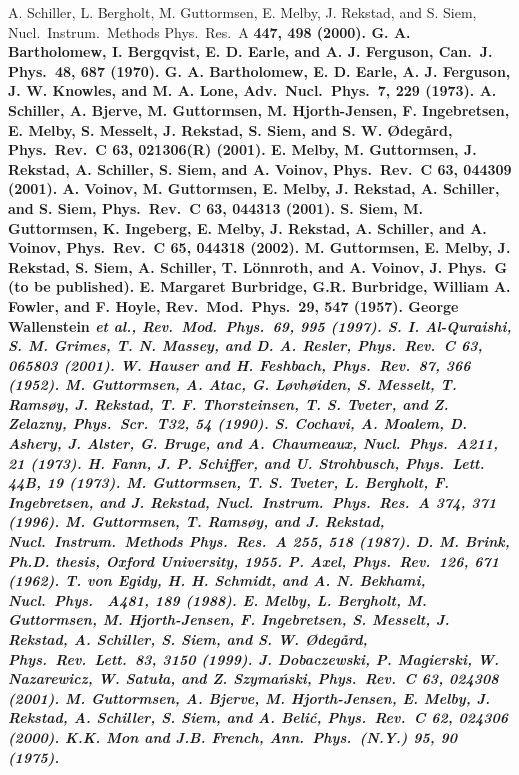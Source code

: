 \begin{multicols}{2}
\begin{references}
A. Schiller, L. Bergholt, M. Guttormsen, E. Melby, J. Rekstad, 
and S. Siem, Nucl.\ Instrum.\ Methods Phys.\ Res.\ A \bf 447\rm, 498 (2000).
G. A. Bartholomew, I. Bergqvist, E. D. Earle, and A. J. Ferguson,
Can.\ J. Phys.\ \bf 48\rm, 687 (1970).
G. A. Bartholomew, E. D. Earle, A. J. Ferguson, J. W. Knowles, 
and M. A. Lone, Adv.\ Nucl.\ Phys.\ \bf 7\rm, 229 (1973). 
A. Schiller, A. Bjerve, M. Guttormsen, M. Hjorth-Jensen, F. 
Ingebretsen, E. Melby, S. Messelt, J. Rekstad, S. Siem, and S. W. 
{\O}deg{\aa}rd, Phys.\ Rev.\ C \bf 63\rm, 021306(R) (2001).
E. Melby, M. Guttormsen, J. Rekstad, A. Schiller, S. Siem, and A.
Voinov, Phys.\ Rev.\ C \bf 63\rm, 044309 (2001).
A. Voinov, M. Guttormsen, E. Melby, J. Rekstad, A. Schiller, and
S. Siem, Phys.\ Rev.\ C \bf 63\rm, 044313 (2001).
S. Siem, M. Guttormsen, K. Ingeberg, E. Melby, J. Rekstad, A.
Schiller, and A. Voinov, Phys.\ Rev.\ C \bf 65\rm, 044318 (2002).
M. Guttormsen, E. Melby, J. Rekstad, S. Siem, A. Schiller, T. 
L{\"o}nnroth, and A. Voinov, J. Phys.\ G (to be published).
E. Margaret Burbridge, G.R. Burbridge, William A. Fowler, and F.
Hoyle, Rev.\ Mod.\ Phys.\ \bf 29\rm, 547 (1957). 
George Wallenstein \sl et al.\rm, Rev.\ Mod.\ Phys.\ \bf 69\rm,
995 (1997).
S. I. Al-Quraishi, S. M. Grimes, T. N. Massey, and D. A. Resler,
Phys.\ Rev.\ C \bf 63\rm, 065803 (2001).
W. Hauser and H. Feshbach, Phys.\ Rev.\ \bf 87\rm, 366 (1952).
M. Guttormsen, A. Atac, G. L{\o}vh{\o}iden, S. Messelt, T.
Rams{\o}y, J. Rekstad, T. F. Thorsteinsen, T. S. Tveter, and Z. Zelazny, Phys.\
Scr.\ \bf T32\rm, 54 (1990). 
S. Cochavi, A. Moalem, D. Ashery, J. Alster, G. Bruge, and A. 
Chaumeaux, Nucl.\ Phys.\ \bf A211\rm, 21 (1973).
H. Fann, J. P. Schiffer, and U. Strohbusch, Phys.\ Lett.\ \bf 
44B\rm, 19 (1973).
M. Guttormsen, T. S. Tveter, L. Bergholt, F. Ingebretsen, and J.
Rekstad, Nucl.\ Instrum.\ Phys.\ Res.\ A \bf 374\rm, 371 (1996).
\bibitem{GR87}M. Guttormsen, T. Rams{\o}y, and J. Rekstad, Nucl.\ Instrum.\ 
Methods Phys.\ Res.\ A \bf 255\rm, 518 (1987).
\bibitem{Br55}D. M. Brink, Ph.D. thesis, Oxford University, 1955.
\bibitem{Ax62}P. Axel, Phys.\ Rev.\ \bf 126\rm, 671 (1962).
\bibitem{ES88}T. von Egidy, H. H. Schmidt, and A. N. Bekhami, Nucl.\ Phys.\ \bf
A481\rm, 189 (1988).
\bibitem{MB99}E. Melby, L. Bergholt, M. Guttormsen, M. Hjorth-Jensen, F. 
Ingebretsen, S. Messelt, J. Rekstad, A. Schiller, S. Siem, and S. W. 
{\O}deg{\aa}rd, Phys.\ Rev.\ Lett.\ \bf 83\rm, 3150 (1999).
\bibitem{DM01}J. Dobaczewski, P. Magierski, W. Nazarewicz, W. Satu{\l}a, and Z.
Szyma{\'n}ski, Phys.\ Rev.\ C \bf 63\rm, 024308 (2001).
\bibitem{GB00}M. Guttormsen, A. Bjerve, M. Hjorth-Jensen, E. Melby, J. Rekstad,
A. Schiller, S. Siem, and A. Beli{\'c}, Phys.\ Rev.\ C \bf 62\rm, 024306 
(2000).
\bibitem{MF75}K.K. Mon and J.B. French, Ann.\ Phys.\ (N.Y.) \bf 95\rm, 90 
(1975).
\end{references}

\end{multicols}

